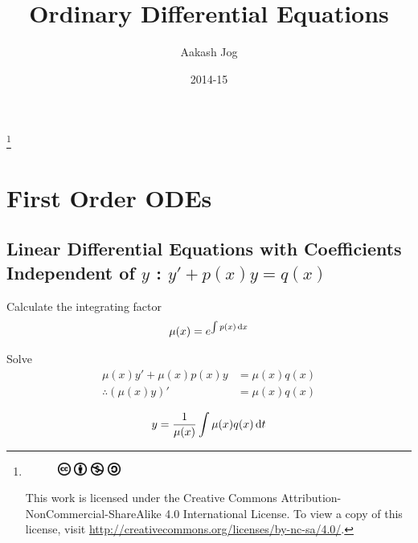 \documentclass[fleqn, a4paper, 12pt, twoside]{article}
\title{Ordinary Differential Equations}
\author{Aakash Jog}
\date{2014-15}
\theoremstyle{definition}
\theoremstyle{theorem}
\newcommand\blfootnote[1]{%
	\begingroup
	\renewcommand\thefootnote{}\footnote{#1}%
	\addtocounter{footnote}{-1}%
	\endgroup
}
\begin{document}
\maketitle

\blfootnote
{	
	\begin{figure}[H]
		\includegraphics[height = 12pt]{cc.eps}
		\includegraphics[height = 12pt]{by.eps}
		\includegraphics[height = 12pt]{nc.eps}
		\includegraphics[height = 12pt]{sa.eps}
	\end{figure}
	This work is licensed under the Creative Commons Attribution-NonCommercial-ShareAlike 4.0 International License. To view a copy of this license, visit \url{http://creativecommons.org/licenses/by-nc-sa/4.0/}.
} %

\tableofcontents


\newpage
\section{First Order ODEs}

\subsection{Linear Differential Equations with Coefficients Independent of $y$ : $y' + p(x) y = q(x)$}

\begin{algorithmic}[1]
	\item 
		Calculate the integrating factor
		\begin{equation*}
			\mu(x) = e^{\int p(x) \dif x}
		\end{equation*}
	\item 
		Solve
		\begin{align*}
			\mu(x) y' + \mu(x) p(x) y &= \mu(x) q(x)\\
			\therefore \left( \mu(x) y \right)' &= \mu(x) q(x)
		\end{align*}
	\item 
		\begin{equation*}
			y = \frac{1}{\mu(x)} \int \mu(x) q(x) \dif t
		\end{equation*}
\end{algorithmic}
\end{document}
